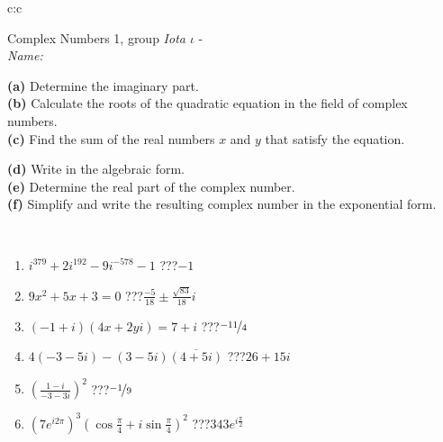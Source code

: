 \documentclass[10pt]{report}
\begin{document}
\begin{tabular}{c:c}
\begin{minipage}[c][104.5mm][t]{0.5\linewidth}
\begin{center}
\vspace{5mm}
{\huge Complex Numbers 1, group \textit{Iota $\iota$} -}\\[5mm]
\textit{Name:}\phantom{xxxxxxxxxxxxxxxxxxxxxxxxxxxxxxxxxxxxxxxxxxxxxxxxxxxxxxxxxxxxxxxxx}\\[5mm]
\begin{minipage}{0.95\linewidth}
\begin{center}
{\small \begin{minipage}{0.44\textwidth} \raggedright
\textbf{(a)} Determine the imaginary part. \\[1mm]
\textbf{(b)} Calculate the roots of the quadratic equation in the field of complex numbers. \\[1mm]
\textbf{(c)} Find the sum of the real numbers \(x\) and \(y\) that satisfy the equation. \end{minipage} \begin{minipage}{0.54\textwidth}
\textbf{(d)} Write in the algebraic form. \\[1mm]
\textbf{(e)} Determine the real part of the complex number. \\[1mm]
\textbf{(f)} Simplify and write the resulting complex number in the exponential form.
\end{minipage}
} \vspace{3mm}
\end{center}
\end{minipage}
\\[1mm]
\begin{minipage}{0.79\linewidth}
\begin{center}
\begin{varwidth}{\linewidth}
\setlength{\itemsep}{0pt}
\begin{enumerate}
\large
\item $i^{379}+2i^{192}-9i^{-578}-1$\quad \dotfill\; ???\;\dotfill \quad $-1$
\item $9x^2+5x+3=0$\quad \dotfill\; ???\;\dotfill \quad $\frac{-5}{18} \pm{}\frac{ \sqrt{83}}{18}i$
\item $(-1+i)(4x+2yi)=7+i$\quad \dotfill\; ???\;\dotfill \quad $\nicefrac{-11}{4}$
\item $4(-3-5i)-(3-5i)\overline{(4+5i)}$\quad \dotfill\; ???\;\dotfill \quad $26+15i$
\item $\left(\frac{1-i}{-3-3i}\right)^2$\quad \dotfill\; ???\;\dotfill \quad $\nicefrac{-1}{9}$
\item $\left(7e^{i2\pi}\right)^{3}\left(\cos{\frac{\pi}{4}}+i\sin{\frac{\pi}{4}}\right)^{2}$\quad \dotfill\; ???\;\dotfill \quad $343e^{i\frac{\pi}{2}}$

\end{enumerate}
\end{varwidth}
\end{center}
\end{minipage}
\end{center}
\end{minipage}
\end{tabular}
\end{document}
